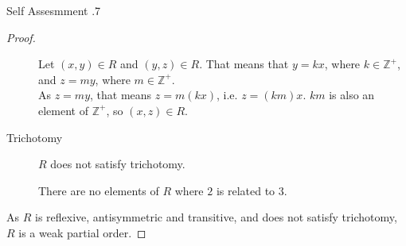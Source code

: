\documentclass[\main/notes.tex]{subfiles}
\begin{document}
\begin{exercise}{Self Assesmment \thechapter.7}
\begin{questions}
\begin{answer}
\begin{proof}
\begin{description}
\begin{subproof}
												Let $(x, y) \in R$ and $(y, z) \in R$. That means that $y = kx$, where $k \in \mathbb{Z}^{+}$, and $z = my$, where $m \in \mathbb{Z}^{+}$.\\
												As $z = my$, that means $z = m(kx)$, i.e. $z = (km)x$. $km$ is also an element of $\mathbb{Z}^{+}$, so $(x, z) \in R$.
											\end{subproof}
										\item[Trichotomy] $R$ does not satisfy trichotomy.
											\begin{subproof}[Counterexample]
												There are no elements of $R$ where $2$ is related to $3$.
											\end{subproof}
									\end{description}
									As $R$ is reflexive, antisymmetric and transitive, and does not satisfy trichotomy, $R$ is a weak partial order.
								\end{proof}
							\end{answer}
					\end{questions}
				\end{exercise}
		\pagebreak
\end{document}
